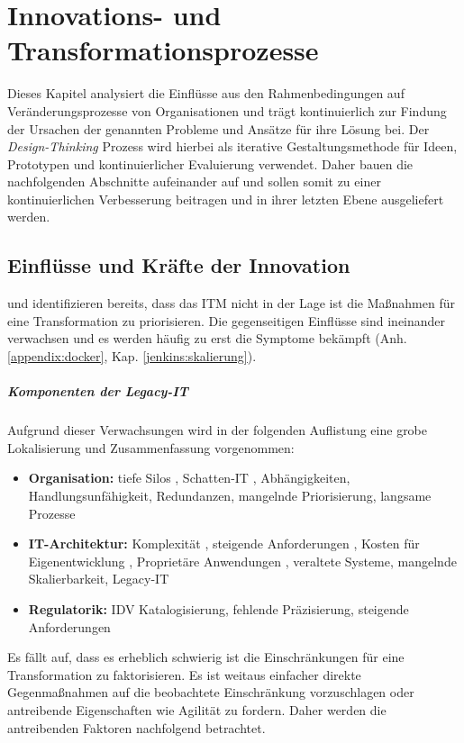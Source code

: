 \chapter{Innovations- und Transformationsprozesse}
\label{chap:innovation}
Dieses Kapitel analysiert die Einflüsse aus den Rahmenbedingungen auf Veränderungsprozesse von Organisationen und trägt kontinuierlich zur Findung der Ursachen der genannten Probleme und Ansätze für ihre Lösung bei. Der \emph{Design-Thinking} Prozess wird hierbei als iterative Gestaltungsmethode für Ideen, Prototypen und kontinuierlicher Evaluierung verwendet. Daher bauen die nachfolgenden Abschnitte aufeinander auf und sollen somit zu einer kontinuierlichen Verbesserung beitragen und in ihrer letzten Ebene ausgeliefert werden.

\section{Einflüsse und Kräfte der Innovation}
\citet{Ganswindt2006} und \citet{Koch2016} identifizieren bereits, dass das \ac{ITM} nicht in der Lage ist die Maßnahmen für eine Transformation zu priorisieren.
Die gegenseitigen Einflüsse sind ineinander verwachsen und es werden häufig zu erst die Symptome bekämpft (Anh.\ref{appendix:docker}, Kap. \ref{jenkins:skalierung}).

\paragraph{Komponenten der Legacy-IT}
\label{einschr:assets}
Aufgrund dieser Verwachsungen wird in der folgenden Auflistung eine grobe Lokalisierung und Zusammenfassung vorgenommen:
\begin{itemize}
    \item \textbf{Organisation:} tiefe Silos \cite{Gupta:2017}, Schatten-IT \cite{recht/Bornemann2018}, Abhängigkeiten, Handlungsunfähigkeit, Redundanzen, mangelnde Priorisierung, langsame Prozesse
    \item \textbf{IT-Architektur:} Komplexität \cite{Brockhoff2006}, steigende Anforderungen \cite{Brockhoff2006}, Kosten für Eigenentwicklung \cite{Gupta:2017}, Proprietäre Anwendungen \cite{Bussmann2006}, veraltete Systeme, mangelnde Skalierbarkeit, Legacy-IT
    \item \textbf{Regulatorik:} \ac{IDV} Katalogisierung\cite{recht/Bornemann2018}, fehlende Präzisierung, steigende Anforderungen
\end{itemize}

Es fällt auf, dass es erheblich schwierig ist die Einschränkungen für eine Transformation zu faktorisieren. Es ist weitaus einfacher direkte Gegenmaßnahmen auf die beobachtete Einschränkung vorzuschlagen oder antreibende Eigenschaften wie Agilität zu fordern. Daher werden die antreibenden Faktoren nachfolgend betrachtet.

